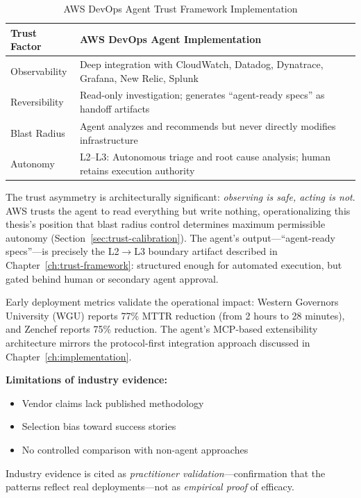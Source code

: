 \begin{table}[htbp]
\centering
\caption{AWS DevOps Agent Trust Framework Implementation}
\label{tab:aws-devops-trust}
\begin{tabular}{ll}
\toprule
\textbf{Trust Factor} & \textbf{AWS DevOps Agent Implementation} \\
\midrule
Observability & Deep integration with CloudWatch, Datadog, Dynatrace, Grafana, New Relic, Splunk \\
Reversibility & Read-only investigation; generates ``agent-ready specs'' as handoff artifacts \\
Blast Radius & Agent analyzes and recommends but never directly modifies infrastructure \\
Autonomy & L2--L3: Autonomous triage and root cause analysis; human retains execution authority \\
\bottomrule
\end{tabular}
\end{table}

The trust asymmetry is architecturally significant: \textit{observing is safe, acting is not}. AWS trusts the agent to read everything but write nothing, operationalizing this thesis's position that blast radius control determines maximum permissible autonomy (Section~\ref{sec:trust-calibration}). The agent's output---``agent-ready specs''---is precisely the L2$\to$L3 boundary artifact described in Chapter~\ref{ch:trust-framework}: structured enough for automated execution, but gated behind human or secondary agent approval.

Early deployment metrics validate the operational impact: Western Governors University (WGU) reports 77\% MTTR reduction (from 2 hours to 28 minutes), and Zenchef reports 75\% reduction. The agent's MCP-based extensibility architecture mirrors the protocol-first integration approach discussed in Chapter~\ref{ch:implementation}.

\textbf{Limitations of industry evidence:}
\begin{itemize}
    \item Vendor claims lack published methodology
    \item Selection bias toward success stories
    \item No controlled comparison with non-agent approaches
\end{itemize}

Industry evidence is cited as \textit{practitioner validation}---confirmation that the patterns reflect real deployments---not as \textit{empirical proof} of efficacy.

